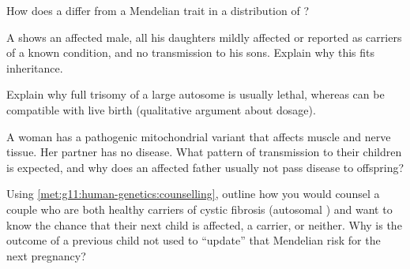 \begin{exercise}[$\star\star$]\label{exo:g11:human-genetics:8}
How does a  differ from a  Mendelian trait in a
 distribution of ?
\end{exercise}

\begin{exercise}[$\star\star\star$]\label{exo:g11:human-genetics:9}
A  shows an affected male, all his daughters mildly affected or
reported as carriers of a known  condition, and no transmission to his
sons. Explain why this fits  inheritance.
\end{exercise}

\begin{exercise}[$\star\star\star$]\label{exo:g11:human-genetics:10}
Explain why full trisomy of a large autosome is usually lethal, whereas  can be compatible with live birth (qualitative argument about  dosage).
\end{exercise}

\begin{exercise}[$\star\star$]\label{exo:g11:human-genetics:11}
A woman has a pathogenic mitochondrial  variant that affects muscle and
nerve tissue. Her partner has no  disease. What pattern of transmission
to their children is expected, and why does an affected father usually not
pass  disease to offspring?
\end{exercise}

\begin{exercise}[$\star\star\star$]\label{exo:g11:human-genetics:12}
Using \cref{met:g11:human-genetics:counselling}, outline how you would counsel
a couple who are both healthy carriers of cystic fibrosis (autosomal )
and want to know the chance that their next child is affected, a carrier, or
neither. Why is the outcome of a previous child not used to ``update'' that
Mendelian risk for the next pregnancy?
\end{exercise}


